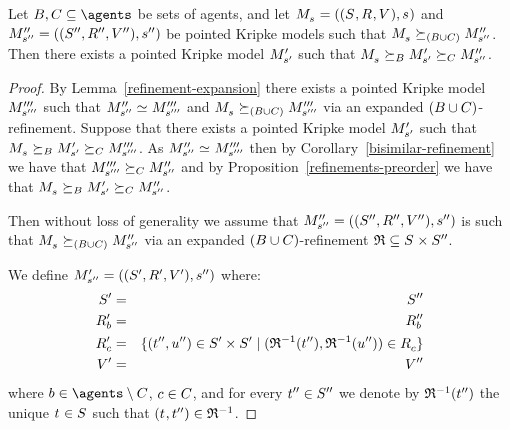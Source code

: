 \begin{proposition}\label{refinement-decomposition}
Let $\agentsB, \agentsC \subseteq \agents$ be sets of agents, and let $\kPModelAndTuple{\kStateS}$ and $\kPModelAndTuplePP{\kStateSPP}$ be pointed Kripke models such that $\kPModel{\kStateS} \simulates[(\agentsB \cup \agentsC)] \kPModelPP{\kStateSPP}$.
Then there exists a pointed Kripke model ${M^{\prime}_{{s}^{\prime}}}$ such that $\kPModel{\kStateS} \simulatesBs \kPModelP{\kStateSP} \simulatesCs \kPModelPP{\kStateSPP}$.
\end{proposition}

\begin{proof}
By Lemma~\ref{refinement-expansion} there exists a pointed Kripke model ${M^{\prime\prime\prime}_{{s}^{\prime\prime\prime}}}$ such that $\kPModelPP{\kStateSPP} \bisimilar \kPModelPPP{\kStateSPPP}$ and $\kPModel{\kStateS} \simulates[(\agentsB \cup \agentsC)] \kPModelPPP{\kStateSPPP}$ via an expanded $(B \cup C)$-refinement.
Suppose that there exists a pointed Kripke model ${M^{\prime}_{{s}^{\prime}}}$ such that $\kPModel{\kStateS} \simulatesBs \kPModelP{\kStateSP} \simulatesCs \kPModelPPP{\kStateSPPP}$.
As $\kPModelPP{\kStateSPP} \bisimilar \kPModelPPP{\kStateSPPP}$ then by Corollary~\ref{bisimilar-refinement} we have that ${M^{\prime\prime\prime}_{{s}^{\prime\prime\prime}}} \succeq_{C} {M^{\prime\prime}_{{s}^{\prime\prime}}}$ and by Proposition~\ref{refinements-preorder} we have that $\kPModel{\kStateS} \simulatesBs \kPModelP{\kStateSP} \simulatesCs \kPModelPP{\kStateSPP}$.

Then without loss of generality we assume that $\kPModelAndTuplePP{\kStateSPP}$ is such that $\kPModel{\kStateS} \simulates[(\agentsB \cup \agentsC)] \kPModelPP{\kStateSPP}$ via an expanded $(B \cup C)$-refinement $\refinement \subseteq \kStates \times \kStatesPP$.

We define $\kPModelAndTupleP{\kStateSPP}$ where:
\begin{eqnarray*}
    \kStatesP &=& \kStatesPP\\
    \kAccessibilityPB &=& \kAccessibilityPPB\\
    \kAccessibilityPC &=& \{(\kStateTPP, \kStateUPP) \in \kStatesP \times \kStatesP \mid (\refinement^{-1}(\kStateTPP), \refinement^{-1}(\kStateUPP)) \in \kAccessibilityC \}\\
    \kValuationP &=& \kValuationPP
\end{eqnarray*}
where $\agentB \in \agents \setminus \agentsC$, $c \in C$, and for every ${t}^{\prime\prime} \in {S^{\prime\prime}}$ we denote by $\mathfrak{R}^{-1}({t}^{\prime\prime})$ the unique $\kStateT \in \kStates$ such that $(\kStateT, \kStateTPP) \in \refinement^{-1}$.


\end{proof}
